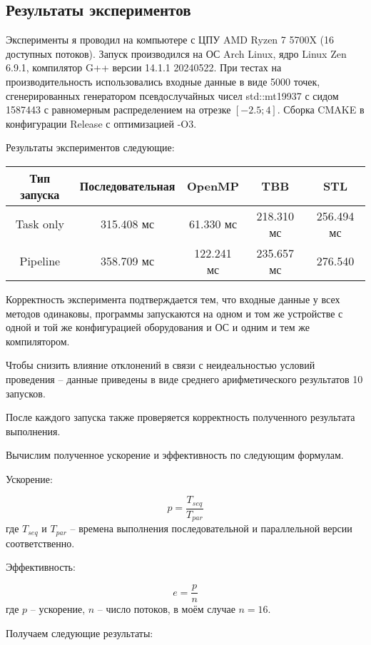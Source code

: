 \documentclass[a4paper]{article}
\begin{document}
\subsection{Результаты экспериментов}

Эксперименты я проводил на компьютере с ЦПУ AMD Ryzen 7 5700X (16 доступных потоков). Запуск производился на 
ОС Arch Linux, ядро Linux Zen 6.9.1, компилятор G++ версии 14.1.1 20240522.
При тестах на производительность использовались входные данные в виде 5000 точек, сгенерированных 
генератором псевдослучайных чисел std::mt19937 с сидом 1587443 с равномерным распределением
на отрезке $[-2.5; 4]$. Сборка CMAKE в конфигурации Release с оптимизацией -O3.

Результаты экспериментов следующие:


\begin{center}
    \begin{tabular}{ |c|c|c|c|c| }
        \hline
        Тип запуска & Последовательная & OpenMP & TBB & STL \\
        \hline
        Task only & 315.408 мс & 61.330 мс & 218.310 мс & 256.494 мс \\
        \hline
        Pipeline & 358.709 мс & 122.241 мс & 235.657 мс & 276.540 \\
        \hline
    \end{tabular}
\end{center}

Корректность эксперимента подтверждается тем, что входные данные у всех методов одинаковы, 
программы запускаются на одном и том же устройстве с одной и той же конфигурацией оборудования и ОС и одним
и тем же компилятором. 

Чтобы снизить влияние отклонений в связи с неидеальностью условий проведения -- данные приведены 
в виде среднего арифметического результатов 10 запусков. 

После каждого запуска также проверяется корректность полученного результата выполнения.

Вычислим полученное ускорение и эффективность по следующим формулам.

Ускорение:

$$p = \frac{T_{seq}}{T_{par}}$$
где $T_{seq}$ и $T_{par}$ -- времена выполнения последовательной и параллельной версии соответственно.

Эффективность:

$$e = \frac{p}{n}$$
где $p$ -- ускорение, $n$ -- число потоков, в моём случае $n = 16$.

Получаем следующие результаты:
\end{document}

